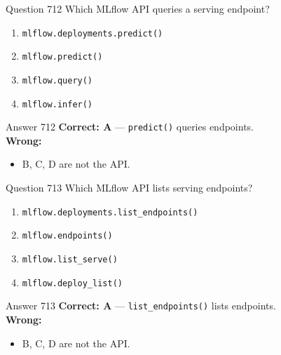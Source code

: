 \documentclass[aspectratio=169,11pt]{beamer}
\begin{document}
	\begin{frame}{Question 712}
		Which MLflow API queries a serving endpoint?
		\begin{enumerate}[label=\Alph*.]
			\item \texttt{mlflow.deployments.predict()}
			\item \texttt{mlflow.predict()}
			\item \texttt{mlflow.query()}
			\item \texttt{mlflow.infer()}
		\end{enumerate}
	\end{frame}
	\begin{frame}{Answer 712}
		\textbf{Correct: A} --- \texttt{predict()} queries endpoints.\\
		\vspace{0.5em}
		\textbf{Wrong:}
		\begin{itemize}
			\item B, C, D are not the API.
		\end{itemize}
	\end{frame}
	
	\begin{frame}{Question 713}
		Which MLflow API lists serving endpoints?
		\begin{enumerate}[label=\Alph*.]
			\item \texttt{mlflow.deployments.list\_endpoints()}
			\item \texttt{mlflow.endpoints()}
			\item \texttt{mlflow.list\_serve()}
			\item \texttt{mlflow.deploy\_list()}
		\end{enumerate}
	\end{frame}
	\begin{frame}{Answer 713}
		\textbf{Correct: A} --- \texttt{list\_endpoints()} lists endpoints.\\
		\vspace{0.5em}
		\textbf{Wrong:}
		\begin{itemize}
			\item B, C, D are not the API.
		\end{itemize}
	\end{frame}
	
\end{document}
